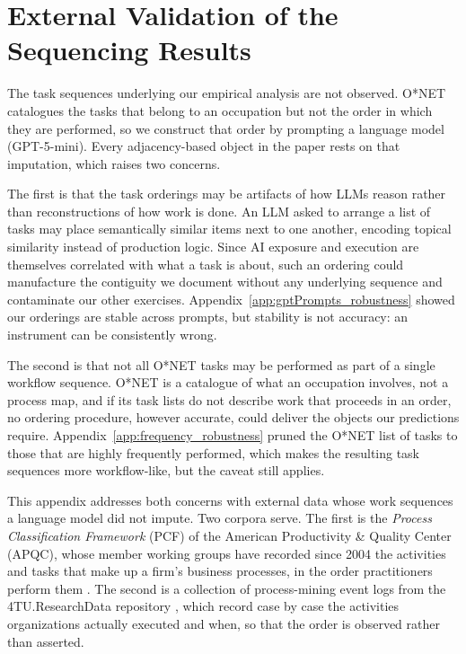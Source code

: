 \section{External Validation of the Sequencing Results}
\label{app:external_validation}

The task sequences underlying our empirical analysis are not observed.
O*NET catalogues the tasks that belong to an occupation but not the order in which they are performed, so we
construct that order by prompting a language model (GPT-5-mini).
Every adjacency-based object in the paper rests on that imputation, which raises two concerns.

The first is that the task orderings may be artifacts of how LLMs reason rather than reconstructions of
how work is done.
An LLM asked to arrange a list of tasks may place semantically similar items next to one another, encoding
topical similarity instead of production logic.
Since AI exposure and execution are themselves correlated with what a task is about, such an ordering could manufacture the
contiguity we document without any underlying sequence and contaminate our other exercises.
Appendix~\ref{app:gptPrompts_robustness} showed our orderings are stable across prompts, but stability is
not accuracy: an instrument can be consistently wrong.

The second is that not all O*NET tasks may be performed as part of a single workflow sequence.
O*NET is a catalogue of what an occupation involves, not a process map, and if its task lists do not describe
work that proceeds in an order, no ordering procedure, however accurate, could deliver the objects our predictions require.
Appendix~\ref{app:frequency_robustness} pruned the O*NET list of tasks to those that are highly frequently performed, which makes
the resulting task sequences more workflow-like, but the caveat still applies.

This appendix addresses both concerns with external data whose work sequences a language model did not impute.
Two corpora serve.
The first is the \emph{Process Classification Framework} (PCF) of the American Productivity \& Quality Center
(APQC), whose member working groups have recorded since 2004 the activities and tasks that make up a firm's
business processes, in the order practitioners perform them \citep{apqc_pcf}.
The second is a collection of process-mining event logs from the 4TU.ResearchData repository \citep{roadfines_log, sepsis_log, bpi2017_log, bpi2020_log}, which
record case by case the activities organizations actually executed and when, so that the order is observed
rather than asserted.

